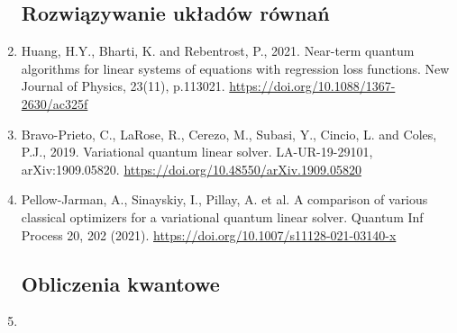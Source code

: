 \documentclass[a4paper,11pt]{article}
\begin{document}
\begin{enumerate}
\def\labelenumi{\arabic{enumi}.}

\subsection*{Rozwiązywanie układów równań}

\item Huang, H.Y., Bharti, K. and Rebentrost, P., 2021. Near-term quantum algorithms for linear systems of equations with regression loss functions. New Journal of Physics, 23(11), p.113021. \url{https://doi.org/10.1088/1367-2630/ac325f}


\item Bravo-Prieto, C., LaRose, R., Cerezo, M., Subasi, Y., Cincio, L. and Coles, P.J., 2019. Variational quantum linear solver. LA-UR-19-29101, arXiv:1909.05820. \url{https://doi.org/10.48550/arXiv.1909.05820}

\item Pellow-Jarman, A., Sinayskiy, I., Pillay, A. et al. A comparison of various classical optimizers for a variational quantum linear solver. Quantum Inf Process 20, 202 (2021). \url{https://doi.org/10.1007/s11128-021-03140-x}

\subsection*{Obliczenia kwantowe}

\item


\end{enumerate}
\end{document}
